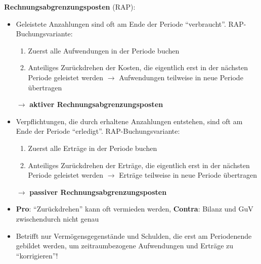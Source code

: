 \textbf{Rechnungsabgrenzungsposten} (RAP):
\begin{itemize}
	\item Geleistete Anzahlungen sind oft am Ende der Periode \enquote{verbraucht}. RAP-Buchungsvariante:
	\begin{enumerate}
		\item Zuerst alle Aufwendungen in der Periode buchen
		\item Anteiliges Zurückdrehen der Kosten, die eigentlich erst in der nächsten Periode geleistet werden
		$\rightarrow$ Aufwendungen teilweise in neue Periode übertragen
	\end{enumerate}
	$\rightarrow$ \textbf{aktiver Rechnungsabgrenzungsposten}
	\item Verpflichtungen, die durch erhaltene Anzahlungen entstehen, sind oft am Ende der Periode \enquote{erledigt}. RAP-Buchungsvariante:
	\begin{enumerate}
		\item Zuerst alle Erträge in der Periode buchen
		\item Anteiliges Zurückdrehen der Erträge, die eigentlich erst in der nächsten Periode geleistet werden
		$\rightarrow$ Erträge teilweise in neue Periode übertragen
	\end{enumerate}
	$\rightarrow$ \textbf{passiver Rechnungsabgrenzungsposten}
	\item \textbf{Pro}: \enquote{Zurückdrehen} kann oft vermieden werden, \textbf{Contra}: Bilanz und GuV zwischendurch nicht genau
	\item Betrifft nur Vermögensgegenstände und Schulden, die erst am Periodenende gebildet werden, um zeitraumbezogene Aufwendungen und Erträge zu \enquote{korrigieren}!
\end{itemize}